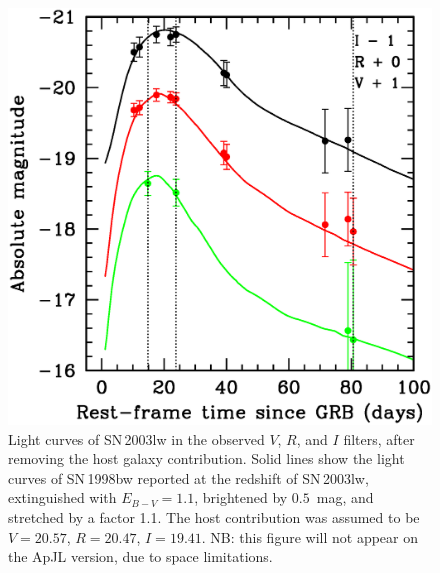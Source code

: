 \documentclass{emulateapj}
\begin{document}
\begin{figure}\centering
  \includegraphics[width=\textwidth]{sn.ps}
  \caption{Light curves of SN\,2003lw in the observed $V$, $R$, and $I$
  filters, after removing the host galaxy contribution. Solid lines show
  the light curves of SN\,1998bw \citep{Ga98,Mc00} reported at the
  redshift of SN\,2003lw, extinguished with $E_{B-V} = 1.1$, brightened
  by $0.5$~mag, and stretched by a factor 1.1. The host contribution was
  assumed to be $V = 20.57$, $R = 20.47$, $I = 19.41$. NB: this figure
  will not appear on the ApJL version, due to space limitations.}
\end{figure}
\end{document}
